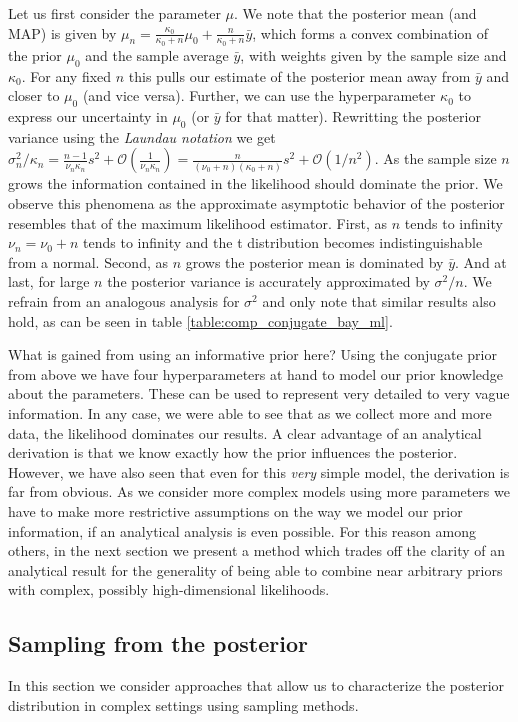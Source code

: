 Let us first consider the parameter $\mu$.
We note that the posterior mean (and MAP) is given by $\mu_n =\frac{\kappa_0}{\kappa_0 + n}\mu_0 + \frac{n}{\kappa_0 + n}\bar{y}$, which forms a convex combination of the prior $\mu_0$ and the sample average $\bar{y}$, with weights given by the sample size and $\kappa_0$.
For any fixed $n$ this pulls our estimate of the posterior mean away from $\bar{y}$ and closer to $\mu_0$ (and vice versa).
Further, we can use the hyperparameter $\kappa_0$ to express our uncertainty in $\mu_0$ (or $\bar{y}$ for that matter).
Rewritting the posterior variance using the \emph{Laundau notation} we get $\sigma_n^2 / \kappa_n = \frac{n-1}{\nu_n \kappa_n} s^2 + \mathcal{O}(\frac{1}{\nu_n\kappa_n}) = \frac{n}{(\nu_0 + n)(\kappa_0 + n)} s^2 + \mathcal{O}(1/n^2)$.
As the sample size $n$ grows the information contained in the likelihood should dominate the prior.
We observe this phenomena as the approximate asymptotic behavior of the posterior resembles that of the maximum likelihood estimator.
First, as $n$ tends to infinity $\nu_n = \nu_0 + n$ tends to infinity and the t distribution becomes indistinguishable from a normal.
Second, as $n$ grows the posterior mean is dominated by $\bar{y}$. And at last, for large $n$ the posterior variance is accurately approximated by $\sigma^2 / n$.
We refrain from an analogous analysis for $\sigma^2$ and only note that similar results also hold, as can be seen in table \ref{table:comp_conjugate_bay_ml}.

What is gained from using an informative prior here?
Using the conjugate prior from above we have four hyperparameters at hand to model our prior knowledge about the parameters.
These can be used to represent very detailed to very vague information.
In any case, we were able to see that as we collect more and more data, the likelihood dominates our results.
A clear advantage of an analytical derivation is that we know exactly how the prior influences the posterior.
However, we have also seen that even for this \emph{very} simple model, the derivation is far from obvious.
As we consider more complex models using more parameters we have to make more restrictive assumptions on the way we model our prior information, if an analytical analysis is even possible.
For this reason among others, in the next section we present a method which trades off the clarity of an analytical result for the generality of being able to combine near arbitrary priors with complex, possibly high-dimensional likelihoods.


\newpage
\subsection{Sampling from the posterior}
In this section we consider approaches that allow us to characterize the posterior distribution in complex settings using sampling methods.

